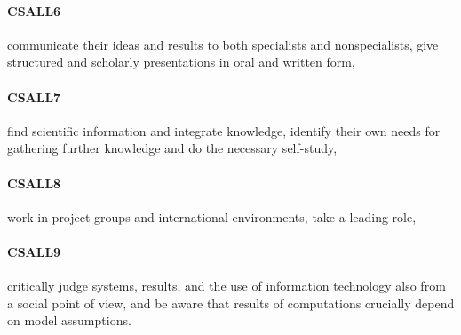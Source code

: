 \paragraph{CSALL6} communicate their ideas and results to both specialists and
  nonspecialists, give structured and scholarly presentations in oral
  and written form,
\paragraph{CSALL7} find scientific information and integrate knowledge, identify
  their own needs for gathering further knowledge and do the necessary
  self-study,
\paragraph{CSALL8} work in project groups and international environments, take a
  leading role,
\paragraph{CSALL9} critically judge systems, results, and the use of information
  technology also from a social point of view, and be aware that
  results of computations crucially depend on model assumptions.
